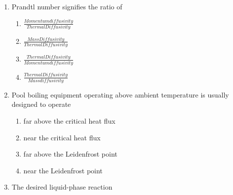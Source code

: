 \documentclass[journal,12pt,onecolumn]{IEEEtran}
\theoremstyle{remark}
\begin{document}
\begin{enumerate}
     \hfill{}
\begin{multicols}{2}
    \begin{enumerate}
        \item $\phi_{sphere} > \phi_{cylinder} > \phi_{cube}$
        \item $\phi_{sphere} = \phi_{cylinder} = \phi_{cube}$
        \item $\phi_{sphere} < \phi_{cylinder} < \phi_{cube}$
        \item $\phi_{sphere} > \phi_{cylinder} = \phi_{cube} $
    \end{enumerate}
\end{multicols}

    \item Prandtl number signifies the ratio of
    
     \hfill{}
\begin{multicols}{2}
    \begin{enumerate}
    \item $\frac{Momentum diffusivity}{Thermal Diffusivity}$
    \item $\frac{Mass Diffusivity}{Thermal Diffusivity}$
    \item $\frac{Thermal Diffusivity}{Momentum diffusivity}$
    \item $\frac{Thermal Diffusivity}{Mass diffusivity}$
    \end{enumerate}
\end{multicols}

    \item Pool boiling equipment operating above ambient temperature is usually designed to operate
    
     \hfill{}
\begin{multicols}{2}
    \begin{enumerate}
        \item far above the critical heat flux
        \item near the critical heat flux
        \item far above the Leidenfrost point
        \item near the Leidenfrost point
    \end{enumerate}
\end{multicols}
\newpage

    \item  The desired liquid-phase reaction

    


\end{enumerate}
\end{document}
